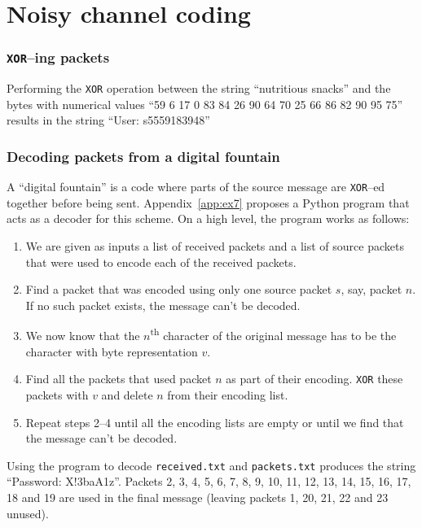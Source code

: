 \documentclass[10pt,a4paper,oneside,onecolumn]{article}
\newcommand*{\receivedTXT}{{\tt received.txt}\xspace}
\newcommand*{\packetsTXT}{{\tt packets.txt}\xspace}
\newcommand*{\XOR}{{\tt XOR}\xspace}
\begin{document}
\part{Noisy channel coding}


\section{\XOR--ing packets}\label{sec:ex6}

Performing the \XOR operation between the string ``nutritious snacks'' and the
bytes with numerical values ``59 6 17 0 83 84 26 90 64 70 25 66 86 82 90 95 75''
results in the string ``User: s5559183948''


\section{Decoding packets from a digital fountain}\label{sec:ex7}

A ``digital fountain'' is a code where parts of the source message are \XOR--ed
together before being sent. Appendix~\ref{app:ex7} proposes a Python program
that acts as a decoder for this scheme. On a high level, the program works as
follows:

\begin{enumerate}
\item We are given as inputs a list of received packets and a list of source
      packets that were used to encode each of the received packets.
\item Find a packet that was encoded using only one source packet $s$, say,
      packet $n$.  If no such packet exists, the message can't be decoded.
\item We now know that the $n$\textsuperscript{th} character of the original
      message has to be the character with byte representation $v$.
\item Find all the packets that used packet $n$ as part of their encoding.
      \XOR these packets with $v$ and delete $n$ from their encoding list.
\item Repeat steps 2--4 until all the encoding lists are empty or until we find
      that the message can't be decoded.
\end{enumerate}

Using the program to decode \receivedTXT and \packetsTXT produces the string
``Password: X!3baA1z''. Packets 2, 3, 4, 5, 6, 7, 8, 9, 10, 11, 12, 13, 14, 15,
16, 17, 18 and 19 are used in the final message (leaving packets 1, 20, 21, 22
and 23 unused).
\end{document}
